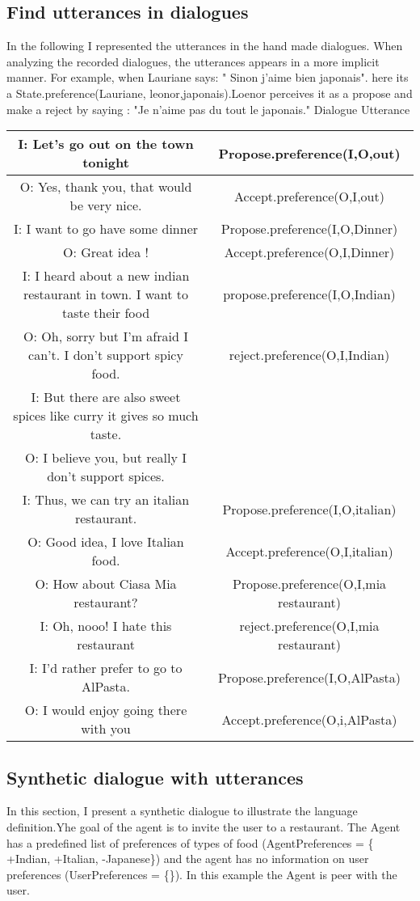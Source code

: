 \documentclass{llncs}
\begin{document}
 \subsection{Find utterances in dialogues}	
 
 In the following I represented the utterances in the hand made dialogues. When analyzing the recorded dialogues, the utterances appears in a more implicit manner. For example, when Lauriane says: " Sinon j'aime bien japonais". here its a State.preference(Lauriane, leonor,japonais).Loenor perceives it as a propose and make a reject by saying : "Je n'aime pas du tout le japonais."
 Dialogue	Utterance
 \begin{tabular}{|c|c|}
   \hline
 I: Let's go out on the town tonight &	Propose.preference(I,O,out) \\
   \hline
 O: Yes, thank you, that would be very nice. &	Accept.preference(O,I,out)\\
   \hline
 I: I want to go have some dinner &	Propose.preference(I,O,Dinner)\\
   \hline
 O: Great idea ! &	Accept.preference(O,I,Dinner)\\
   \hline
 I: I heard about a new indian restaurant in town. I want to taste their food &	propose.preference(I,O,Indian)\\
   \hline
 O: Oh, sorry but I'm afraid I can't. I don't support spicy food.&	reject.preference(O,I,Indian)\\
   \hline
 I: But there are also sweet spices like curry it gives so much taste. 	\\
   \hline
 O: I believe you, but really I don't support spices.\\
   \hline	
 I: Thus, we can try an italian restaurant. &	Propose.preference(I,O,italian)\\
   \hline
 O: Good idea, I love Italian food. &	Accept.preference(O,I,italian)\\
   \hline
 O: How about Ciasa Mia restaurant? &	Propose.preference(O,I,mia restaurant)\\
   \hline
 I: Oh, nooo! I hate this restaurant&	reject.preference(O,I,mia restaurant)\\
   \hline
 I: I'd rather prefer to go to AlPasta. &	Propose.preference(I,O,AlPasta)\\
   \hline
 O: I would enjoy going there with you&	Accept.preference(O,i,AlPasta)\\
   \hline
\end{tabular}
 \subsection{Synthetic dialogue with utterances}
 In this section, I present a synthetic dialogue to illustrate the language definition.Yhe goal of the agent is to invite the user to a restaurant. The Agent has a predefined list of preferences of types of food (AgentPreferences = \{ +Indian, +Italian, -Japanese\}) and the agent has no information on user preferences (UserPreferences = \{\}). In this example the Agent is peer with the user. 
\end{document}
